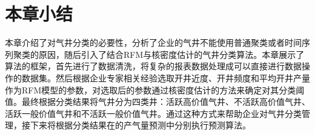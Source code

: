 \section{本章小结}
本章介绍了对气井分类的必要性，分析了企业的气井不能使用普通聚类或者时间序列聚类的原因，随后引入了结合RFM与核密度估计的气井分类算法。本章展示了算法的框架，首先进行了数据清洗，将复杂的报表数据处理成可以直接进行数据操作的数据集。然后根据企业专家相关经验选取开井近度、开井频度和平均开井产量
作为RFM模型的参数，对选取后的参数通过核密度估计的方法来确定对其分类阈值。最终根据分类结果将气井分为四类井：活跃高价值气井、不活跃高价值气井、活跃一般价值气井和不活跃一般价值气井。通过这种方式来帮助企业对气井分类管理，接下来将根据分类结果在的产气量预测中分别执行预测算法。
    